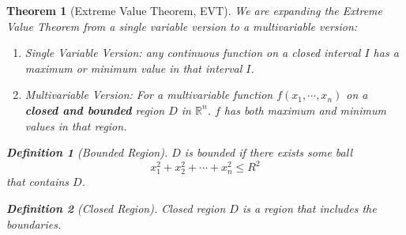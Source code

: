 \documentclass[12pt,a4paper]{article}
\newtheorem{thm}{Theorem}[subsection]
\newtheorem{df}{Definition}[subsection]
\def\R{{\mathbb{R}}}
\begin{document}
\begin{thm}[Extreme Value Theorem, EVT]
	We are expanding the Extreme Value Theorem from a single variable version to a multivariable	version: 
	\begin{enumerate}
		\item Single Variable Version: any continuous function on a closed interval $I$ has a maximum or minimum value in that interval $I$.
		\item Multivariable Version: For a multivariable function $f(x_1,\cdots,x_n)$ on a \textbf{closed and bounded} region $D$ in $\R^n$. $f$ has both maximum and minimum values in that region.
	\end{enumerate}
	\begin{df}[Bounded Region]
		$D$ is bounded if there exists some ball \[x_1^2+x_2^2+\cdots+x_n^2\leq R^2\]	that contains $D$. 
	\end{df}
	\begin{df}[Closed Region]
		Closed region $D$ is a region that includes the boundaries. 	
	\end{df}
\end{thm}
\end{document}
